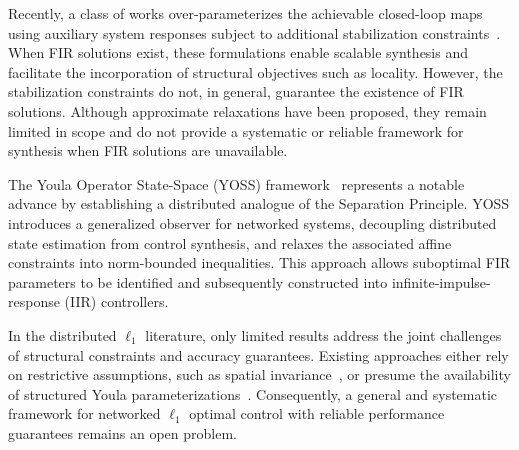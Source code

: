 Recently, a class of works over-parameterizes the achievable closed-loop maps using auxiliary system responses subject to additional stabilization constraints~\cite{SLSparametrization, wang2019SLS, Furieri2019IOP, Zheng2022SLP_IOP, Gulnihal2018thesis}. When FIR solutions exist, these formulations enable scalable synthesis and facilitate the incorporation of structural objectives such as locality. However, the stabilization constraints do not, in general, guarantee the existence of FIR solutions. Although approximate relaxations have been proposed, they remain limited in scope and do not provide a systematic or reliable framework for synthesis when FIR solutions are unavailable.

The Youla Operator State-Space (YOSS) framework~\cite{naghnaeian2019youla} represents a notable advance by establishing a distributed analogue of the Separation Principle. YOSS introduces a generalized observer for networked systems, decoupling distributed state estimation from control synthesis, and relaxes the associated affine constraints into norm-bounded inequalities. This approach allows suboptimal FIR parameters to be identified and subsequently constructed into infinite-impulse-response (IIR) controllers. 


In the distributed $\ell_1$ literature, only limited results address the joint challenges of structural constraints and accuracy guarantees. Existing approaches either rely on restrictive assumptions, such as spatial invariance~\cite{Bamieh2005CvxSI}, or presume the availability of structured Youla parameterizations~\cite{Gulnihal2015l1}. Consequently, a general and systematic framework for networked $\ell_1$ optimal control with reliable performance guarantees remains an open problem.
